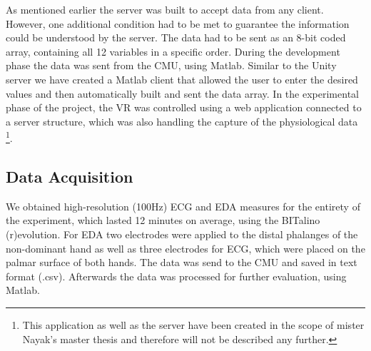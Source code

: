 As mentioned earlier the server was built to accept data from any client. However, one additional condition had to be met to guarantee the information could be understood by the server. The data had to be sent as an 8-bit coded array, containing all 12 variables in a specific order. During the development phase the data was sent from the CMU, using Matlab. Similar to the Unity server we have created a Matlab client that allowed the user to enter the desired values and then automatically built and sent the data array. In the experimental phase of the project, the VR was controlled using a web application connected to a server structure, which was also handling the capture of the physiological data \footnote{This application as well as the server have been created in the scope of mister Nayak's master thesis and therefore will not be described any further.}. 

%

\subsection{Data Acquisition}
We obtained high-resolution (100Hz) ECG and EDA measures for the entirety of the experiment, which lasted 12 minutes on average, using the BITalino (r)evolution. For EDA two electrodes were applied to the distal phalanges of the non-dominant hand as well as three electrodes for ECG, which were placed on the palmar surface of both hands. The data was send to the CMU and saved in text format (.csv). Afterwards the data was processed for further evaluation, using Matlab.

